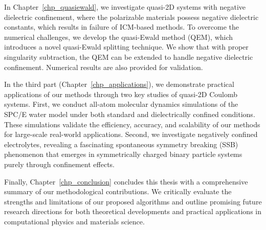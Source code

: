 In Chapter~\ref{chp_quasiewald}, we investigate quasi-2D systems with negative dielectric confinement, where the polarizable materials possess negative dielectric constants, which results in failure of ICM-based methods.
To overcome the numerical challenges, we develop the quasi-Ewald method (QEM), which introduces a novel quasi-Ewald splitting technique.
We show that with proper singularity subtraction, the QEM can be extended to handle negative dielectric confinement.
Numerical results are also provided for validation.

In the third part (Chapter~\ref{chp_applications}), we demonstrate practical applications of our methods through two key studies of quasi-2D Coulomb systems. 
First, we conduct all-atom molecular dynamics simulations of the SPC/E water model under both standard and dielectrically confined conditions. 
These simulations validate the efficiency, accuracy, and scalability of our methods for large-scale real-world applications. 
Second, we investigate negatively confined electrolytes, revealing a fascinating spontaneous symmetry breaking (SSB) phenomenon that emerges in symmetrically charged binary particle systems purely through confinement effects.

Finally, Chapter~\ref{chp_conclusion} concludes this thesis with a comprehensive summary of our methodological contributions. 
We critically evaluate the strengths and limitations of our proposed algorithms and outline promising future research directions for both theoretical developments and practical applications in computational physics and materials science.